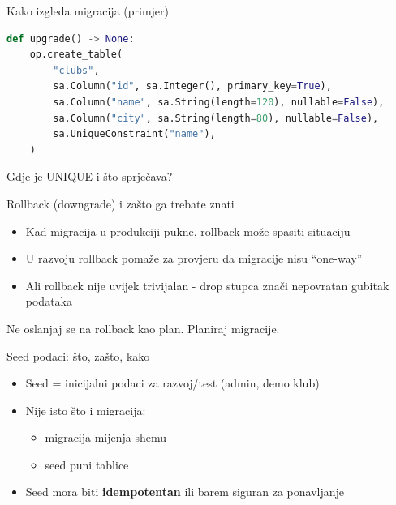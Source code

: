 	\begin{frame}[fragile,shrink=5]{Kako izgleda migracija (primjer)}
\begin{lstlisting}[language=python]
def upgrade() -> None:
    op.create_table(
        "clubs",
        sa.Column("id", sa.Integer(), primary_key=True),
        sa.Column("name", sa.String(length=120), nullable=False),
        sa.Column("city", sa.String(length=80), nullable=False),
        sa.UniqueConstraint("name"),
    )
\end{lstlisting}
		
		\vspace{0.6em}
		Gdje je UNIQUE i što sprječava?
	\end{frame}
	
	\begin{frame}{Rollback (downgrade) i zašto ga trebate znati}
		\begin{itemize}
			\item Kad migracija u produkciji pukne, rollback može spasiti situaciju
			\item U razvoju rollback pomaže za provjeru da migracije nisu \enquote{one-way}
			\item Ali rollback nije uvijek trivijalan - drop stupca znači nepovratan gubitak podataka
		\end{itemize}
		
		\vspace{0.6em}
		Ne oslanjaj se na rollback kao plan. Planiraj migracije.
	\end{frame}
	
	\begin{frame}{Seed podaci: što, zašto, kako}
		\begin{itemize}
			\item Seed = inicijalni podaci za razvoj/test (admin, demo klub)
			\item Nije isto što i migracija:
			\begin{itemize}
				\item migracija mijenja shemu
				\item seed puni tablice
			\end{itemize}
			\item Seed mora biti \textbf{idempotentan} ili barem siguran za ponavljanje
		\end{itemize}
	\end{frame}
	
